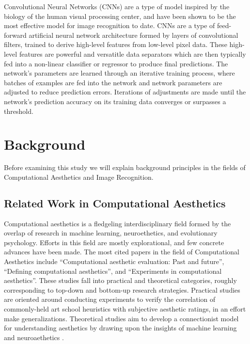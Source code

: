 \documentclass[midd]{thesis}
\begin{document}
Convolutional Neural Networks (CNNs) are a type of model inspired by the biology of the human visual processing center, and have been shown to be the most effective model for image recognition to date.
CNNs are a type of feed-forward artificial neural network architecture formed by layers of convolutional filters, trained to derive high-level features from low-level pixel data. These high-level features are powerful and versatitle data separators which are then typically fed into a non-linear classifier or regressor to produce final predictions. The network's parameters are learned through an iterative training process, where batches of examples are fed into the network and network parameters are adjusted to reduce prediction errors. Iterations of adjustments are made until the network's prediction accuracy on its training data converges or surpasses a threshold.

\chapter{Background}
Before examining this study we will explain background principles in the fields of Computational Aesthetics and Image Recognition.

\section{Related Work in Computational Aesthetics}
Computational aesthetics is a fledgeling interdisciplinary field formed by the overlap of research in machine learning, neuroethetics, and evolutionary psychology. Efforts in this field are mostly explorational, and few concrete advances have been made. The most cited papers in the field of Computational Aesthetics include ``Computational aesthetic evaluation: Past and future'', ``Defining computational aesthetics'', and ``Experiments in computational aesthetics''. These studies fall into practical and theoretical categories, roughly corresponding to top-down and bottom-up research strategies. Practical studies are oriented around conducting experiments to verify the correlation of commonly-held art school heuristics with subjective aesthetic ratings, in an effort make generalizations. Theoretical studies aim to develop a connectionist model for understanding aesthetics by drawing upon the insights of machine learning and neuroaethetics \cite{galanter2012computational, hoenig2005defining, machado2008experiments}.

\end{document}
